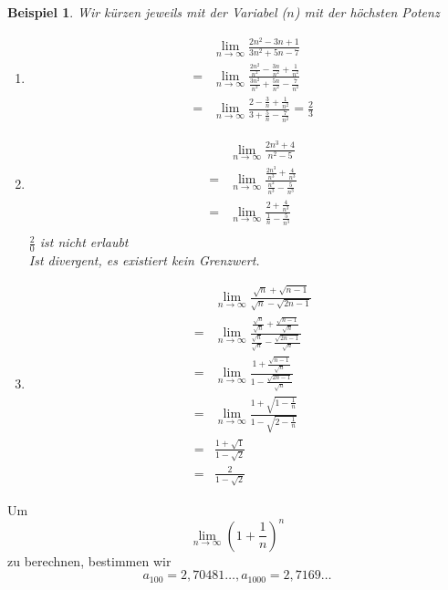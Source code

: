 \documentclass[a4paper,10pt]{report}
\newtheorem{myexample}{Beispiel}
\begin{document}
\newpage
\begin{myexample}Wir kürzen jeweils mit der Variabel ($n$) mit der höchsten Potenz
\begin{enumerate}
	\item 
	\begin{eqnarray*}
		&&\lim_{n \to \infty} \frac{2n^2-3n+1}{3n^2+5n-7} \\
		&=& \lim_{n \to \infty}\frac{\frac{2n^2}{n^2}-\frac{3n}{n^2}+\frac{1}{n^2}}{\frac{3n^2}{n^2}+\frac{5n}{n^2}-\frac{7}{n^2}} \\
		&=& \lim_{n \to \infty}\frac{2-\frac{3}{n}+\frac{1}{n^2}}{3+\frac{5}{n}-\frac{7}{n^2}} = \frac{2}{3}
	\end{eqnarray*}
	\item
	\begin{eqnarray*}
		&&\lim_{n \to \infty} \frac{2n^3+4}{n^2-5}\\
		&=&\lim_{n \to \infty} \frac{\frac{2n^3}{n^3}+ \frac{4}{n^3}}{\frac{n^2}{n^3}-\frac{5}{n^3}}\\
		&=&\lim_{n \to \infty} \frac{2+ \frac{4}{n^3}}{\frac{1}{n}-\frac{5}{n^3}}\\
	\end{eqnarray*}
	$\frac{2}{0}$ ist nicht erlaubt\\
	Ist divergent, es existiert kein Grenzwert. 
	\item \begin{eqnarray*}
	&&\lim_{n \to \infty}\frac{\sqrt{n}+\sqrt{n-1}}{\sqrt{n}-\sqrt{2n-1}} \\
	& = & \lim_{n \to \infty}\frac{\frac{\sqrt{n}}{\sqrt{n}}+\frac{\sqrt{n-1}}{\sqrt{n}}}{\frac{\sqrt{n}}{\sqrt{n}}-\frac{\sqrt{2n-1}}{\sqrt{n}}} \\
	&=& \lim_{n \to \infty}\frac{1+\frac{\sqrt{n-1}}{\sqrt{n}}}{1-\frac{\sqrt{2n-1}}{\sqrt{n}}} \nonumber \\
	&=& \lim_{n \to \infty}\frac{1+\sqrt{1-\frac{1}{n}}}{1-\sqrt{2-\frac{1}{n}}} \\
	&=& \frac{1+\sqrt{1}}{1-\sqrt{2}} \\
	&=& \frac{2}{1-\sqrt{2}}
	\end{eqnarray*}
\end{enumerate}\end{myexample}
\newpage
\noindent
Um
\begin{equation*}\lim_{n \to \infty} (1+\frac{1}{n})^n\end{equation*}
zu berechnen, bestimmen wir
\begin{equation*}a_{100} = 2,70481 \ldots, a_{1000} = 2,7169\ldots\end{equation*}
\end{document}
